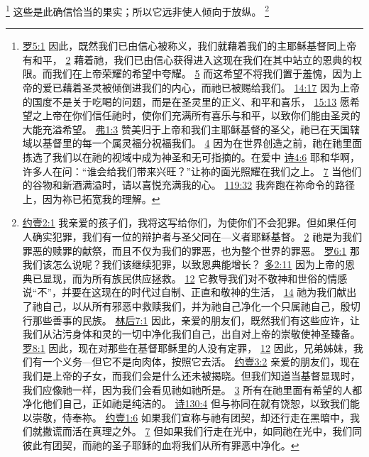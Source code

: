 \documentclass[12pt, a4paper, oneside]{ctexart}
\begin{document}
	\footnote {
		\href{https://biblehub.com/romans/5-1.htm}{罗5:1} 因此，既然我们已由信心被称义，我们就藉着我们的主耶稣基督同上帝有和平，
		\href{https://biblehub.com/romans/5-2.htm}{2} 藉着祂，我们已由信心获得进入这现在我们在其中站立的恩典的权限。而我们在上帝荣耀的希望中夸耀。
		\href{https://biblehub.com/romans/5-5.htm}{5} 而这希望不将我们置于羞愧，因为上帝的爱已藉着圣灵被倾倒进我们的内心，而祂已被赐给我们。
		\href{https://biblehub.com/romans/14-17.htm}{14:17} 因为上帝的国度不是关于吃喝的问题，而是在圣灵里的正义、和平和喜乐，
		\href{https://biblehub.com/romans/15-13.htm}{15:13} 愿希望之上帝在你们信任祂时，使你们充满所有喜乐与和平，以致你们能由圣灵的大能充溢希望。
		\href{https://biblehub.com/ephesians/1-3.htm}{弗1:3} 赞美归于上帝和我们主耶稣基督的圣父，祂已在天国辖域以基督里的每一个属灵福分祝福我们。
		\href{https://biblehub.com/ephesians/1-4.htm}{4} 因为在世界创造之前，祂在祂里面拣选了我们以在祂的视域中成为神圣和无可指摘的。在爱中
		\href{https://biblehub.com/psalms/4-6.htm}{诗4:6} 耶和华啊，许多人在问：“谁会给我们带来兴旺？”让祢的面光照耀在我们之上。
		\href{https://biblehub.com/psalms/4-7.htm}{7} 当他们的谷物和新酒满溢时，请以喜悦充满我的心。
		\href{https://biblehub.com/psalms/119-32.htm}{119:32} 我奔跑在祢命令的路径上，因为祢已拓宽我的理解。
	}
	这些是此确信恰当的果实；所以它远非使人倾向于放纵。
	\footnote {
		\href{https://biblehub.com/1_john/2-1.htm}{约壹2:1} 我亲爱的孩子们，我将这写给你们，为使你们不会犯罪。但如果任何人确实犯罪，我们有一位的辩护者与圣父同在---义者耶稣基督。
		\href{https://biblehub.com/1_john/2-2.htm}{2} 祂是为我们罪恶的赎罪的献祭，而且不仅为我们的罪恶，也为整个世界的罪恶。
		\href{https://biblehub.com/romans/6-1.htm}{罗6:1} 那我们该怎么说呢？我们该继续犯罪，以致恩典能增长？
        \href{https://biblehub.com/titus/2-11.htm}{多2:11} 因为上帝的恩典已显现，而为所有族民供应拯救。
		\href{https://biblehub.com/titus/2-12.htm}{12} 它教导我们对不敬神和世俗的情感说“不”，并要在这现在的时代过自制、正直和敬神的生活，
		\href{https://biblehub.com/titus/2-14.htm}{14} 祂为我们献出了祂自己，以从所有邪恶中救赎我们，并为祂自己净化一个只属祂自己，殷切行那些善事的民族。
		\href{https://biblehub.com/2_corinthians/7-1.htm}{林后7:1} 因此，亲爱的朋友们，既然我们有这些应许，让我们从沾污身体和灵的一切中净化我们自己，出自对上帝的崇敬使神圣臻备。
		\href{https://biblehub.com/romans/8-1.htm}{罗8:1} 因此，现在对那些在基督耶稣里的人没有定罪，
		\href{https://biblehub.com/romans/8-12.htm}{12} 因此，兄弟姊妹，我们有一个义务---但它不是向肉体，按照它去活。
		\href{https://biblehub.com/1_john/3-2.htm}{约壹3:2} 亲爱的朋友们，现在我们是上帝的子女，而我们会是什么还未被揭晓。但我们知道当基督显现时，我们应像祂一样，因为我们会看见祂如祂所是。
		\href{https://biblehub.com/1_john/3-3.htm}{3} 所有在祂里面有希望的人都净化他们自己，正如祂是纯洁的。
		\href{https://biblehub.com/psalms/130-4.htm}{诗130:4} 但与祢同在就有饶恕，以致我们能以崇敬，侍奉祢。
        \href{https://biblehub.com/1_john/1-6.htm}{约壹1:6} 如果我们宣称与祂有团契，却还行走在黑暗中，我们就撒谎而活在真理之外。
		\href{https://biblehub.com/1_john/1-7.htm}{7} 但如果我们行走在光中，如同祂在光中，我们同彼此有团契，而祂的圣子耶稣的血将我们从所有罪恶中净化。
	}
\end{document}
